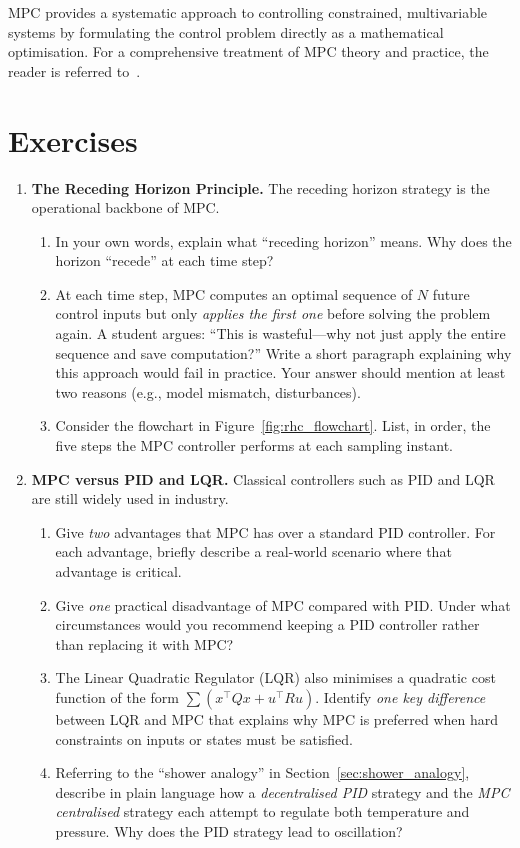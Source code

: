 MPC provides a systematic approach to controlling constrained, multivariable systems by formulating the control problem directly as a mathematical optimisation. For a comprehensive treatment of MPC theory and practice, the reader is referred to~\cite{Rawlings2017}.


\section*{Exercises}

\begin{enumerate}

	\item \textbf{The Receding Horizon Principle.}
	The receding horizon strategy is the operational backbone of MPC.
	\begin{enumerate}
		\item[(a)] In your own words, explain what ``receding horizon'' means. Why does the horizon ``recede'' at each time step?
		\item[(b)] At each time step, MPC computes an optimal sequence of $N$ future control inputs but only \emph{applies the first one} before solving the problem again. A student argues: ``This is wasteful—why not just apply the entire sequence and save computation?'' Write a short paragraph explaining why this approach would fail in practice. Your answer should mention at least two reasons (e.g., model mismatch, disturbances).
		\item[(c)] Consider the flowchart in Figure~\ref{fig:rhc_flowchart}. List, in order, the five steps the MPC controller performs at each sampling instant.
	\end{enumerate}

	\item \textbf{MPC versus PID and LQR.}
	Classical controllers such as PID and LQR are still widely used in industry.
	\begin{enumerate}
		\item[(a)] Give \emph{two} advantages that MPC has over a standard PID controller. For each advantage, briefly describe a real-world scenario where that advantage is critical.
		\item[(b)] Give \emph{one} practical disadvantage of MPC compared with PID. Under what circumstances would you recommend keeping a PID controller rather than replacing it with MPC?
		\item[(c)] The Linear Quadratic Regulator (LQR) also minimises a quadratic cost function of the form $\sum(x^\top Q x + u^\top R u)$. Identify \emph{one key difference} between LQR and MPC that explains why MPC is preferred when hard constraints on inputs or states must be satisfied.
		\item[(d)] Referring to the ``shower analogy'' in Section~\ref{sec:shower_analogy}, describe in plain language how a \emph{decentralised PID} strategy and the \emph{MPC centralised} strategy each attempt to regulate both temperature and pressure. Why does the PID strategy lead to oscillation?
	\end{enumerate}


\end{enumerate}
